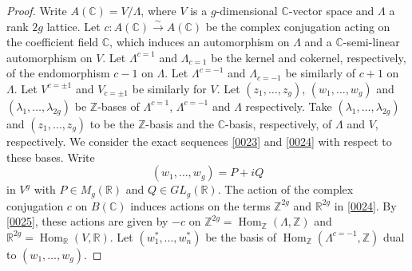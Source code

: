 \documentclass{amsart}
\theoremstyle{remark}
\numberwithin{equation}{section}
\newcommand{\isomto}{\overset{\sim}{\to}}
\newcommand{\Z}{\mathbb{Z}}
\newcommand{\R}{\mathbb{R}}
\newcommand{\C}{\mathbb{C}}
\newcommand{\GL}{\mathit{GL}}
\DeclareMathOperator{\Hom}{Hom}
\begin{document}
\begin{proof}
	Write $A(\C) = V / \Lambda$,
	where $V$ is a $g$-dimensional $\C$-vector space
	and $\Lambda$ a rank $2 g$ lattice.
	Let $c \colon A(\C) \isomto A(\C)$ be the complex conjugation
	acting on the coefficient field $\C$,
	which induces an automorphism on $\Lambda$
	and a $\C$-semi-linear automorphism on $V$.
	Let $\Lambda^{c = 1}$ and $\Lambda_{c = 1}$ be
	the kernel and cokernel, respectively,
	of the endomorphism $c - 1$ on $\Lambda$.
	Let $\Lambda^{c = - 1}$ and $\Lambda_{c = - 1}$ be
	similarly of $c + 1$ on $\Lambda$.
	Let $V^{c = \pm 1}$ and $V_{c = \pm 1}$ be similarly for $V$.
	Let $(z_{1}, \dots, z_{g})$, $(w_{1}, \dots, w_{g})$
	and $(\lambda_{1}, \dots, \lambda_{2 g})$ be
	$\Z$-bases of $\Lambda^{c = 1}$, $\Lambda^{c = -1}$
	and $\Lambda$ respectively.
	Take $(\lambda_{1}, \dots, \lambda_{2 g})$
	and $(z_{1}, \dots, z_{g})$ to be
	the $\Z$-basis and the $\C$-basis, respectively,
	of $\Lambda$ and $V$, respectively.
	We consider the exact sequences \eqref{0023} and \eqref{0024}
	with respect to these bases.
	Write
		\[
				(w_{1}, \dots, w_{g})
			=
				P + i Q
		\]
	in $V^{g}$ with $P \in M_{g}(\R)$ and $Q \in \GL_{g}(\R)$.
	The action of the complex conjugation $c$ on $B(\C)$
	induces actions on the terms $\Z^{2 g}$ and $\R^{2 g}$ in \eqref{0024}.
	By \eqref{0025},
	these actions are given by
	$- c$ on $\Z^{2 g} = \Hom_{\Z}(\Lambda, \Z)$
	and $\R^{2 g} = \Hom_{\R}(V, \R)$.
	Let $(w_{1}^{\ast}, \dots, w_{n}^{\ast})$ be
	the basis of $\Hom_{\Z}(\Lambda^{c = - 1}, \Z)$
	dual to $(w_{1}, \dots, w_{g})$.
	

\end{proof}
\end{document}
